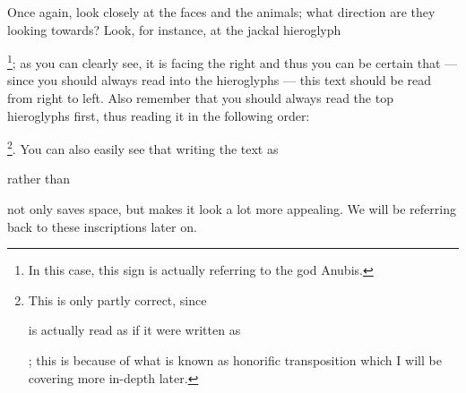 \documentclass[a5paper,twoside,11pt]{report}
\begin{document}
		Once again, look closely at the faces and the animals; what direction are they looking towards? Look, for instance, at the jackal hieroglyph \begin{hieroglyph}{\leavevmode \rightleft\HwordSpace
{}\HwordSpace
\leftright}\end{hieroglyph}\footnote{In this case, this sign is actually referring to the god Anubis.}; as you can clearly see, it is facing the right and thus you can be certain that — since you should always read into the hieroglyphs — this text should be read from right to left. Also remember that you should always read the top hieroglyphs first, thus reading it in the following order: \begin{hieroglyph}{\leavevmode \rightleft\HwordSpace
{}\HinterSignsSpace
{}\HinterSignsSpace
{}\HinterSignsSpace
{}\HinterSignsSpace
{}\HinterSignsSpace
{}\HwordSpace
\leftright}\end{hieroglyph}\footnote{This is only partly correct, since \begin{hieroglyph}{\leavevmode \rightleft\HwordSpace
{}\HinterSignsSpace
{}\HinterSignsSpace
{}\HwordSpace
\leftright}\end{hieroglyph} is actually read as if it were written as \begin{hieroglyph}{\leavevmode \rightleft\HwordSpace
{}\HinterSignsSpace
{}\HinterSignsSpace
{}\HinterSignsSpace
{}\HwordSpace
\leftright}\end{hieroglyph}; this is because of what is known as honorific transposition which I will be covering more in-depth later.}. You can also easily see that writing the text as \begin{hieroglyph}{\leavevmode \rightleft\HwordSpace
{}\HinterSignsSpace
{}\HinterSignsSpace
{}\HinterSignsSpace
{}\HinterSignsSpace
\leftright}\end{hieroglyph} rather than \begin{hieroglyph}{\leavevmode \rightleft\HwordSpace
{}\HinterSignsSpace
{}\HinterSignsSpace
{}\HinterSignsSpace
{}\HinterSignsSpace
{}\HinterSignsSpace
{}\HwordSpace
\leftright}\end{hieroglyph} not only saves space, but makes it look a lot more appealing.
		We will be referring back to these inscriptions later on.
\end{document}
